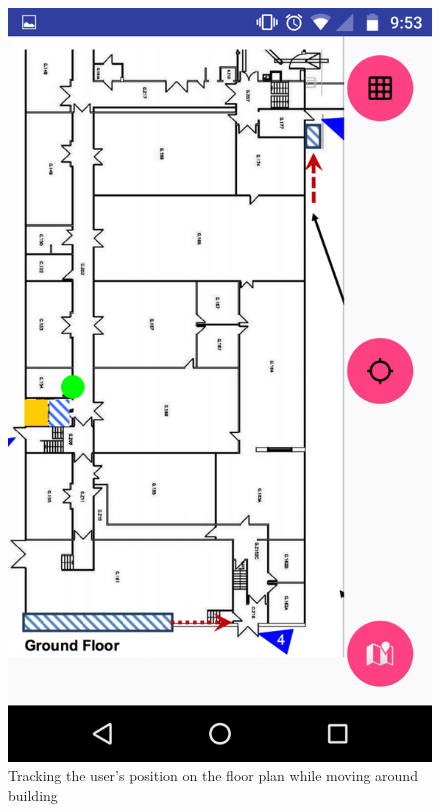 \documentclass[10.8pt]{article}
\begin{document}
\begin{figure}[H]
    \centering
    \begin{minipage}[b]{.3\textwidth} 
        \centering  
        \includegraphics[scale=1.2, width=\linewidth]{pic10.png}     
        \caption{Tracking the user's position on the floor plan while moving around building}  
        \label{fig:1}
    \end{minipage}    
    \hfill
    \begin{minipage}[b]{.3\textwidth}  

\end{minipage}
\end{figure}
\end{document}

